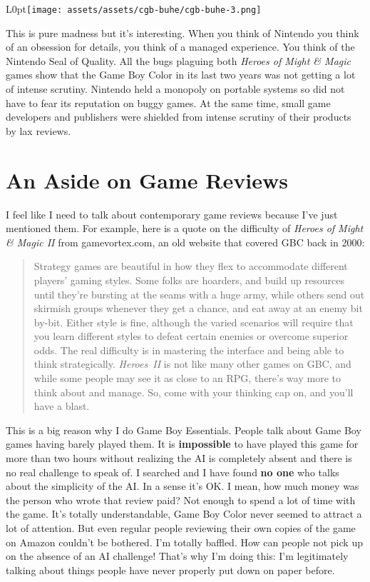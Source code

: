 \documentclass{book}
\begin{document}
\begin{wrapfigure}{L}{0pt}{\texttt{[image: assets/assets/cgb-buhe/cgb-buhe-3.png]}}\end{wrapfigure}\noindent
This is pure madness but it’s interesting. When you think of Nintendo you think of an obsession for details, you think of a managed experience. You think of the Nintendo Seal of Quality. All the bugs plaguing both \emph{Heroes of Might \& Magic} games show that the Game Boy Color in its last two years was not getting a lot of intense scrutiny. Nintendo held a monopoly on portable systems so did not have to fear its reputation on buggy games. At the same time, small game developers and publishers were shielded from intense scrutiny of their products by lax reviews.\par
\FloatBarrier\section*{An Aside on Game Reviews}
I feel like I need to talk about contemporary game reviews because I’ve just mentioned them. For example, here is a quote on the difficulty of \emph{Heroes of Might \& Magic II} from gamevortex.com, an old website that covered GBC back in 2000:\par
\begin{quote}
Strategy games are beautiful in how they flex to accommodate different players’ gaming styles. Some folks are hoarders, and build up resources until they’re bursting at the seams with a huge army, while others send out skirmish groups whenever they get a chance, and eat away at an enemy bit by-bit. Either style is fine, although the varied scenarios will require that you learn different styles to defeat certain enemies or overcome superior odds. The real difficulty is in mastering the interface and being able to think strategically. \emph{Heroes~II} is not like many other games on GBC, and while some people may see it as close to an RPG, there’s way more to think about and manage. So, come with your thinking cap on, and you’ll have a blast.\par
\end{quote} \par
This is a big reason why I do Game Boy Essentials. People talk about Game Boy games having barely played them. It is \textbf{impossible} to have played this game for more than two hours without realizing the AI is completely absent and there is no real challenge to speak of. I searched and I have found \textbf{no one} who talks about the simplicity of the AI. In a sense it’s OK. I mean, how much money was the person who wrote that review paid? Not enough to spend a lot of time with the game. It’s totally understandable, Game Boy Color never seemed to attract a lot of attention. But even regular people reviewing their own copies of the game on Amazon couldn’t be bothered. I’m totally baffled. How can people not pick up on the absence of an AI challenge! That’s why I’m doing this: I’m legitimately talking about things people have never properly put down on paper before.\par
\end{document}
